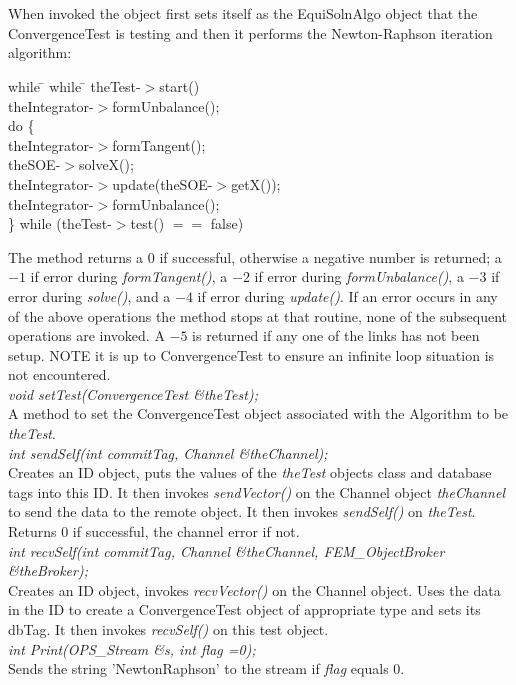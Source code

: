   \\
 \\
When invoked the object first sets itself as the EquiSolnAlgo object
that the ConvergenceTest is testing and then it performs the
Newton-Raphson iteration algorithm: 
\begin{tabbing}
while \= \+ while \= \kill
theTest-$>$start() \\
theIntegrator-$>$formUnbalance(); \\
do \{ \+ \\
theIntegrator-$>$formTangent(); \\
theSOE-$>$solveX(); \\
theIntegrator-$>$update(theSOE-$>$getX()); \\
theIntegrator-$>$formUnbalance(); \- \\
\} while (theTest-$>$test() $==$ false)\- 
\end{tabbing}

\noindent The method returns a 0 if successful, otherwise a negative number is
returned; a $-1$ if error during {\em formTangent()}, a $-2$ if
error during {\em formUnbalance()}, a $-3$ if error during {\em
solve()}, and a $-4$ if error during {\em update()}.
If an error occurs in any of the above operations the method stops at
that routine, none of the subsequent operations are invoked. A $-5$ is
returned if any one of the links has not been setup. NOTE it is up to
ConvergenceTest to ensure an infinite loop situation is not encountered. \\

{\em void setTest(ConvergenceTest \&theTest);} \\
A method to set the ConvergenceTest object associated with the
Algorithm to be {\em theTest}. \\

{\em int sendSelf(int commitTag, Channel \&theChannel);}\\
Creates an ID object, puts the values of the {\em theTest} objects
class and database tags into this ID. It then invokes {\em
sendVector()} on the Channel object {\em theChannel} to send the data
to the remote object. It then invokes {\em sendSelf()} on {\em
theTest}. Returns $0$ if successful, the channel error if not. \\

{\em int recvSelf(int commitTag, Channel \&theChannel, FEM\_ObjectBroker
\&theBroker);}\\ 
Creates an ID object, invokes {\em recvVector()} on the Channel
object. Uses the data in the ID to create a ConvergenceTest object of
appropriate type and sets its dbTag. It then invokes {\em recvSelf()}
on this test object. \\

{\em int Print(OPS\_Stream \&s, int flag =0);} \\
Sends the string 'NewtonRaphson' to the stream if {\em flag} equals $0$.